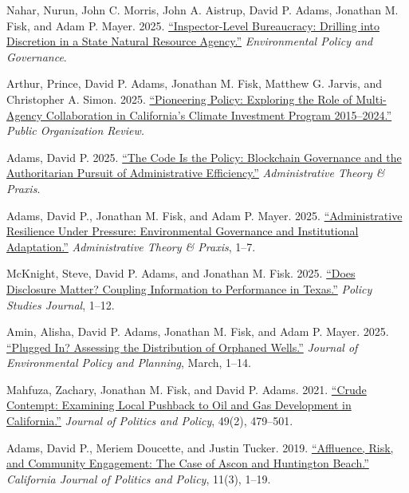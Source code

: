 \documentclass[12pt,letterpaper]{article}
\renewenvironment{itemize}{
  \begin{list}{}{
    \setlength{\leftmargin}{1.5em}
    \setlength{\itemsep}{0.25em}
    \setlength{\parskip}{0pt}
    \setlength{\parsep}{0.25em}
  }
}{
  \end{list}
}
\begin{document}
\begin{itemize}\leftmargin=2pt\itemindent=-15pt\leftmargin=2pt\itemindent=-15pt

    \item Nahar, Nurun, John C. Morris, John A. Aistrup, David P. Adams, Jonathan M. Fisk, and Adam P. Mayer. 2025. \href{https://doi.org/10.1002/eet.70038}{``Inspector-Level Bureaucracy: Drilling into Discretion in a State Natural Resource Agency.''} \emph{Environmental Policy and Governance}. 

    \item Arthur, Prince, David P. Adams, Jonathan M. Fisk, Matthew G. Jarvis, and Christopher A. Simon. 2025. \href{https://doi.org/10.1007/s11115-025-00586-3}{``Pioneering Policy: Exploring the Role of Multi-Agency Collaboration in California's Climate Investment Program 2015--2024.''} \emph{Public Organization Review.}

    \item Adams, David P. 2025. \href{https://doi.org/10.1080/10841806.2025.2585729}{``The Code Is the Policy: Blockchain Governance and the Authoritarian Pursuit of Administrative Efficiency.''} \emph{Administrative Theory \& Praxis}.

    \item Adams, David P., Jonathan M. Fisk, and Adam P. Mayer. 2025. \href{https://doi.org/10.1080/10841806.2025.2537600}{``Administrative Resilience Under Pressure: Environmental Governance and Institutional Adaptation.''} \emph{Administrative Theory \& Praxis}, 1--7.

    \item McKnight, Steve, David P. Adams, and Jonathan M. Fisk. 2025. \href{https://doi.org/10.1111/psj.70064}{``Does Disclosure Matter? Coupling Information to Performance in Texas.''} \emph{Policy Studies Journal}, 1--12.

    \item Amin, Alisha, David P. Adams, Jonathan M. Fisk, and Adam P. Mayer. 2025. \href{https://doi.org/10.1080/1523908X.2025.2480289}{``Plugged In? Assessing the Distribution of Orphaned Wells.''} \emph{Journal of Environmental Policy and Planning}, March, 1--14.

    \item Mahfuza, Zachary, Jonathan M. Fisk, and David P. Adams. 2021. \href{https://doi.org/10.1111/polp.12401}{``Crude Contempt: Examining Local Pushback to Oil and Gas Development in California.''} \emph{Journal of Politics and Policy}, 49(2), 479--501.

    \item Adams, David P., Meriem Doucette, and Justin Tucker. 2019. \href{https://escholarship.org/uc/item/2mz2n6qk}{``Affluence, Risk, and Community Engagement: The Case of Ascon and Huntington Beach.''} \emph{California Journal of Politics and Policy}, 11(3), 1--19.

\end{itemize}
\end{document}

